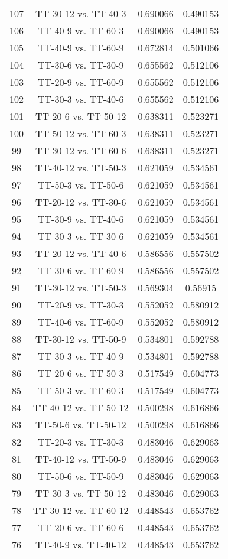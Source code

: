 \documentclass[a4paper,10pt]{article}
\begin{document}
\begin{landscape}
\begin{table}[!htp]
\begin{tabular}{cccc}
107&TT-30-12 vs. TT-40-3&0.690066&0.490153\\
106&TT-40-9 vs. TT-60-3&0.690066&0.490153\\
105&TT-40-9 vs. TT-60-9&0.672814&0.501066\\
104&TT-30-6 vs. TT-30-9&0.655562&0.512106\\
103&TT-20-9 vs. TT-60-9&0.655562&0.512106\\
102&TT-30-3 vs. TT-40-6&0.655562&0.512106\\
101&TT-20-6 vs. TT-50-12&0.638311&0.523271\\
100&TT-50-12 vs. TT-60-3&0.638311&0.523271\\
99&TT-30-12 vs. TT-60-6&0.638311&0.523271\\
98&TT-40-12 vs. TT-50-3&0.621059&0.534561\\
97&TT-50-3 vs. TT-50-6&0.621059&0.534561\\
96&TT-20-12 vs. TT-30-6&0.621059&0.534561\\
95&TT-30-9 vs. TT-40-6&0.621059&0.534561\\
94&TT-30-3 vs. TT-30-6&0.621059&0.534561\\
93&TT-20-12 vs. TT-40-6&0.586556&0.557502\\
92&TT-30-6 vs. TT-60-9&0.586556&0.557502\\
91&TT-30-12 vs. TT-50-3&0.569304&0.56915\\
90&TT-20-9 vs. TT-30-3&0.552052&0.580912\\
89&TT-40-6 vs. TT-60-9&0.552052&0.580912\\
88&TT-30-12 vs. TT-50-9&0.534801&0.592788\\
87&TT-30-3 vs. TT-40-9&0.534801&0.592788\\
86&TT-20-6 vs. TT-50-3&0.517549&0.604773\\
85&TT-50-3 vs. TT-60-3&0.517549&0.604773\\
84&TT-40-12 vs. TT-50-12&0.500298&0.616866\\
83&TT-50-6 vs. TT-50-12&0.500298&0.616866\\
82&TT-20-3 vs. TT-30-3&0.483046&0.629063\\
81&TT-40-12 vs. TT-50-9&0.483046&0.629063\\
80&TT-50-6 vs. TT-50-9&0.483046&0.629063\\
79&TT-30-3 vs. TT-50-12&0.483046&0.629063\\
78&TT-30-12 vs. TT-60-12&0.448543&0.653762\\
77&TT-20-6 vs. TT-60-6&0.448543&0.653762\\
76&TT-40-9 vs. TT-40-12&0.448543&0.653762\\

\end{tabular}
\end{table}
\end{landscape}
\end{document}
